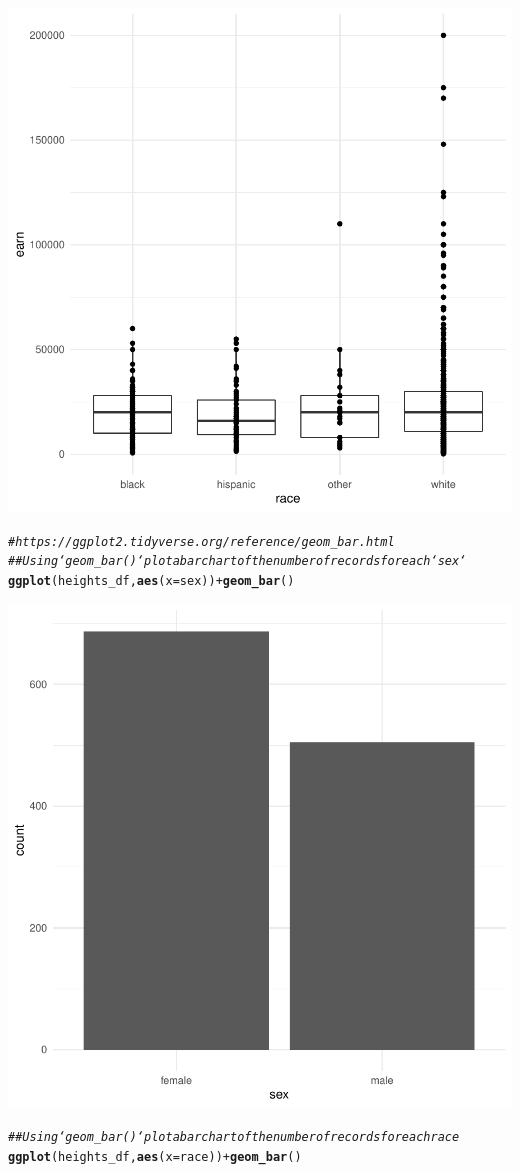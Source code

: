 \documentclass{article}\usepackage[]{graphicx}\usepackage[]{color}
\makeatletter
\newcommand{\hlcom}[1]{\textcolor[rgb]{0.678,0.584,0.686}{\textit{#1}}}%
\newcommand{\hlopt}[1]{\textcolor[rgb]{0,0,0}{#1}}%
\newcommand{\hlstd}[1]{\textcolor[rgb]{0.345,0.345,0.345}{#1}}%
\newcommand{\hlkwc}[1]{\textcolor[rgb]{0.333,0.667,0.333}{#1}}%
\newcommand{\hlkwd}[1]{\textcolor[rgb]{0.737,0.353,0.396}{\textbf{#1}}}%
\newenvironment{kframe}{%
 \def\at@end@of@kframe{}%
 \ifinner\ifhmode%
  \def\at@end@of@kframe{\end{minipage}}%
  \begin{minipage}{\columnwidth}%
 \fi\fi%
 \def\FrameCommand##1{\hskip\@totalleftmargin \hskip-\fboxsep
 \colorbox{shadecolor}{##1}\hskip-\fboxsep
     \hskip-\linewidth \hskip-\@totalleftmargin \hskip\columnwidth}%
 \MakeFramed {\advance\hsize-\width
   \@totalleftmargin\z@ \linewidth\hsize
   \@setminipage}}%
 {\par\unskip\endMakeFramed%
 \at@end@of@kframe}
\newenvironment{knitrout}{}{} %
\makeatother
\begin{document}
\begin{knitrout}
{\centering \includegraphics[width=.6\linewidth]{figure/assignment-04-WilsonStewart-Rnwauto-report-2} 

}


\begin{kframe}\begin{alltt}
\hlcom{# https://ggplot2.tidyverse.org/reference/geom_bar.html}
\hlcom{## Using `geom_bar()` plot a bar chart of the number of records for each `sex`}
\hlkwd{ggplot}\hlstd{(heights_df,} \hlkwd{aes}\hlstd{(}\hlkwc{x}\hlstd{=sex))} \hlopt{+} \hlkwd{geom_bar}\hlstd{()}
\end{alltt}
\end{kframe}

{\centering \includegraphics[width=.6\linewidth]{figure/assignment-04-WilsonStewart-Rnwauto-report-3} 

}


\begin{kframe}\begin{alltt}
\hlcom{## Using `geom_bar()` plot a bar chart of the number of records for each race}
\hlkwd{ggplot}\hlstd{(heights_df,} \hlkwd{aes}\hlstd{(}\hlkwc{x}\hlstd{=race))} \hlopt{+} \hlkwd{geom_bar}\hlstd{()}
\end{alltt}
\end{kframe}


\end{knitrout}
\end{document}
